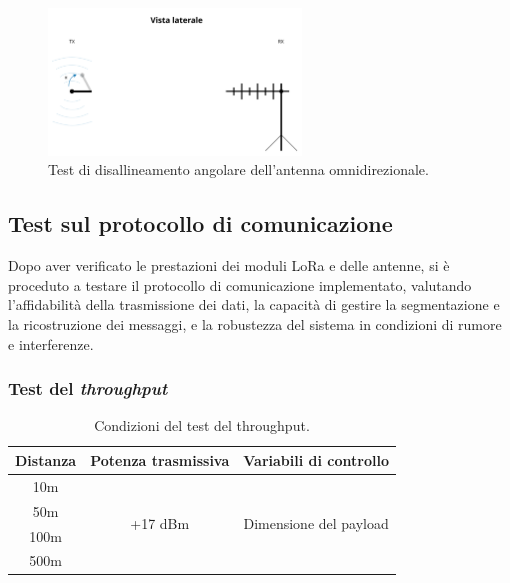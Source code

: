 \documentclass[12pt,a4paper,twoside]{book}
\begin{document}
\begin{figure}[H]
    \centering
    \includegraphics[width=0.6\textwidth]{img/tests/telemetry-test-omni.png}
    \caption{Test di disallineamento angolare dell'antenna omnidirezionale.}
    \label{fig:omnidirectional-test}
\end{figure}

\subsection{Test sul protocollo di comunicazione}
Dopo aver verificato le prestazioni dei moduli \ac{LoRa} e delle antenne, si è
proceduto a testare il protocollo di comunicazione implementato, valutando
l'affidabilità della trasmissione dei dati, la capacità di gestire la segmentazione
e la ricostruzione dei messaggi, e la robustezza del sistema in condizioni
di rumore e interferenze.
\subsubsection{Test del \emph{throughput}}
\begin{table}[H]
    \centering
    \begin{tabular}{|c|c|c|}
        \hline
        \textbf{Distanza} & \textbf{Potenza trasmissiva} & \textbf{Variabili di controllo}         \\ \hline
        10m               & \multirow{4}{*}{+17 dBm}     & \multirow{4}{*}{Dimensione del payload} \\ \cline{1-1}
        50m               &                              &                                         \\ \cline{1-1}
        100m              &                              &                                         \\ \cline{1-1}
        500m              &                              &                                         \\ \hline
    \end{tabular}
    \caption{Condizioni del test del throughput.}
    \label{tab:T1-conditions}
\end{table}
\newpage
\end{document}
